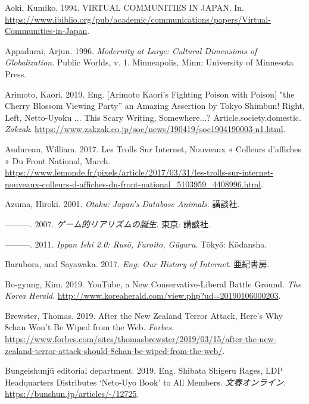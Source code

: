 \documentclass[10pt,british,A4paper,,openany]{memoir}
\begin{document}
\hypertarget{ref-aoki_virtual_1994}{}
Aoki, Kumiko. 1994. VIRTUAL COMMUNITIES IN JAPAN. In.
\url{https://www.ibiblio.org/pub/academic/communications/papers/Virtual-Communities-in-Japan}.

\hypertarget{ref-appadurai_modernity_1996}{}
Appadurai, Arjun. 1996. \emph{Modernity at Large: Cultural Dimensions of
Globalization}. Public Worlds, v. 1. Minneapolis, Minn: University of
Minnesota Press.

\hypertarget{ref-arimoto_eng._2019}{}
Arimoto, Kaori. 2019. Eng. {[}Arimoto Kaori's Fighting Poison with
Poison{]} "the Cherry Blossom Viewing Party'' an Amazing Assertion by
Tokyo Shimbun! Right, Left, Netto-Uyoku ... This Scary Writing,
Somewhere...? Article.society.domestic. \emph{Zakzak}.
\url{https://www.zakzak.co.jp/soc/news/190419/soc1904190003-n1.html}.

\hypertarget{ref-audureau_les_2017}{}
Audureau, William. 2017. Les Trolls Sur Internet, Nouveaux « Colleurs
d'affiches » Du Front National, March.
\url{https://www.lemonde.fr/pixels/article/2017/03/31/les-trolls-sur-internet-nouveaux-colleurs-d-affiches-du-front-national_5103959_4408996.html}.

\hypertarget{ref-azuma_otaku:_2001}{}
Azuma, Hiroki. 2001. \emph{Otaku: Japan's Database Animals}. 講談社.

\hypertarget{ref-azuma__2007}{}
---------. 2007. \emph{ゲーム的リアリズムの誕生}. 東京: 講談社.

\hypertarget{ref-azuma_ippan_2011}{}
---------. 2011. \emph{Ippan Ishi 2.0: Rusō, Furoito, Gūguru}. Tōkyō:
Kōdansha.

\hypertarget{ref-barubora_eng:_2017}{}
Barubora, and Sayawaka. 2017. \emph{Eng: Our History of Internet}.
亜紀書房.

\hypertarget{ref-bo-gyung_youtube_2019}{}
Bo-gyung, Kim. 2019. YouTube, a New Conservative-Liberal Battle Ground.
\emph{The Korea Herald}.
\url{http://www.koreaherald.com/view.php?ud=20190106000203}.

\hypertarget{ref-brewster_after_2019}{}
Brewster, Thomas. 2019. After the New Zealand Terror Attack, Here's Why
8chan Won't Be Wiped from the Web. \emph{Forbes}.
\url{https://www.forbes.com/sites/thomasbrewster/2019/03/15/after-the-new-zealand-terror-attack-should-8chan-be-wiped-from-the-web/}.

\hypertarget{ref-bungeishunju_editorial_department_eng._2019}{}
Bungeishunjū editorial department. 2019. Eng. Shibata Shigeru Rages, LDP
Headquarters Distributes `Neto-Uyo Book' to All Members.
\emph{文春オンライン}. \url{https://bunshun.jp/articles/-/12725}.
\end{document}
